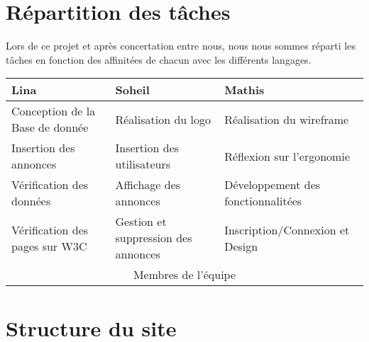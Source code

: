 \documentclass[11pt,a4paper]{article}
\begin{document}
\section{Répartition des tâches}
Lors de ce projet et après concertation entre nous, nous nous sommes réparti les tâches en fonction des affinitées de chacun avec les différents langages.

\begin{center}
    \begin{tabular}{|l|l|l|}
        \hline
        Lina & Soheil & Mathis \\
        \hline
        Conception de la Base de donnée & Réalisation du logo & Réalisation du wireframe \\
        Insertion des annonces & Insertion des utilisateurs & Réflexion sur l'ergonomie \\
        Vérification des données & Affichage des annonces & Développement des fonctionnalitées \\
        Vérification des pages sur W3C & Gestion et suppression des annonces & Inscription/Connexion et Design \\
        \hline
        \multicolumn{3}{|c|}{Membres de l'équipe} \\
    \hline
    \end{tabular}
\end{center}


\section{Structure du site}
\end{document}
